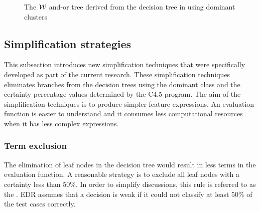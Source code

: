\documentclass[twoside,11pt]{article}
\begin{document}
\begin{figure} [bh!]
\center
\tiny
{}
{

	{
		{
		{
			{
				{
					{
						{
							{}
						}
					}
				}
			}
		}
	}
}
}
\caption{The ${\cal W}$ and-or tree derived from the decision tree in  using dominant clusters}
\label{fig:balanced_and-or}
\end{figure}

\subsection{Simplification strategies}
\label{sec:simplify_strategies}
This subsection introduces new simplification techniques that were specifically developed as part of the current research.  These simplification techniques eliminates branches from the decision trees using the dominant class and the certainty percentage values determined by the C4.5 program.  The aim of the simplification techniques is to produce simpler feature expressions.  An evaluation function is easier to understand and it consumes less computational resources when it has less complex expressions.   

\subsubsection{Term exclusion}
The elimination of leaf nodes in the decision tree would result in less terms in the evaluation function.  A reasonable strategy is to exclude all leaf nodes with a certainty less than $50\%$.  In order to simplify discussions, this rule is referred to as the . EDR assumes that a decision is weak if it could not classify at least $50\%$ of the test cases correctly.  
\end{document}
